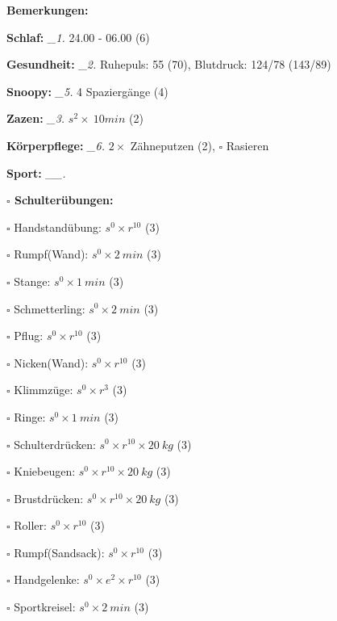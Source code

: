 \documentclass[10pt,a4paper]{article}
\newcommand\prop[1] {{\color {alizarin} {\bf #1}}}             %
\newcommand\mand[1] {{\color {burntorange} {\bf #1}}}          %
\newcommand\topspace{\vskip -15pt \hskip 20pt}
\newcommand\n[1] { {\sl #1.} \hskip 5pt }
\begin{document}
\begin{mdframed}[style=daystyle]
  \begin{labeling}{{\mand {Bemerkungen:}}}
    \setlength\itemsep{-3pt}
  \item[{\mand {Schlaf:}}]        \n{\_1} 24.00 - 06.00 (6)
  \item[{\mand {Gesundheit:}}]    \n{\_2} Ruhepuls: 55 (70), Blutdruck: 124/78 (143/89)
  \item[{\mand {Snoopy:}}]        \n{\_5} 4 Spaziergänge (4) 
  \item[{\mand {Zazen:}}]         \n{\_3} $s^2 \times\ 10 min$ (2)
  \item[{\mand {Körperpflege:}}]  \n{\_6} $2 \times$ Zähneputzen (2), $\square$ Rasieren
  \item[{\mand {Sport:}}]        \n{\_\_}
    \topspace
    \begin{minipage}{0.75\textwidth}  
      \begin{labeling}{\prop {$\square$ {Schulterübungen:}}} 
        \setlength\itemsep{-3pt}
      \item[$\square$ Handstandübung:]  $s^0 \times r^{10}$ (3)
      \item[$\square$ Rumpf(Wand):]     $s^0 \times 2\ min$ (3)
      \item[$\square$ Stange:]          $s^0 \times 1\ min$ (3)
      \item[$\square$ Schmetterling:]   $s^0 \times 2\ min$ (3)
      \item[$\square$ Pflug:]           $s^0 \times r^{10}$ (3)
      \item[$\square$ Nicken(Wand):]    $s^0 \times r^{10}$ (3)
      \item[$\square$ Klimmzüge:]       $s^0 \times r^3$ (3)
      \item[$\square$ Ringe:]           $s^0 \times 1\ min$ (3)
      \item[$\square$ Schulterdrücken:] $s^0 \times r^{10} \times 20\ kg$ (3)
      \item[$\square$ Kniebeugen:]      $s^0 \times r^{10} \times 20\ kg$ (3)
      \item[$\square$ Brustdrücken:]    $s^0 \times r^{10} \times 20\ kg$ (3)
      \item[$\square$ Roller:]          $s^0 \times r^{10}$ (3)
      \item[$\square$ Rumpf(Sandsack):] $s^0 \times r^{10}$ (3)
      \item[$\square$ Handgelenke:]     $s^0 \times e^2 \times r^{10}$ (3)
      \item[$\square$ Sportkreisel:]    $s^0 \times 2\ min$ (3)

\end{labeling}
\end{minipage}
\end{labeling}
\end{mdframed}
\end{document}
